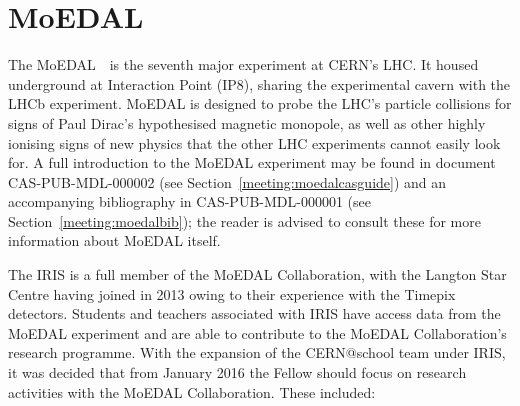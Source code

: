 \section{MoEDAL}
\label{sec:moedal}
The \acl{MoEDAL}~\cite{MoEDAL2009}\
is the seventh major experiment at \acs{CERN}'s \acf{LHC}.
It housed underground at Interaction Point (IP8), sharing
the experimental cavern with the \acs{LHCb} experiment.
%
\acs{MoEDAL} is designed to probe the \acs{LHC}'s particle collisions
for signs of Paul Dirac's hypothesised magnetic monopole,
as well as other highly ionising signs of new physics that
the other \acs{LHC} experiments cannot easily look for.
%
A full introduction to the \acs{MoEDAL} experiment may be found
in document CAS-PUB-MDL-000002 (see Section~\ref{meeting:moedalcasguide})
and an accompanying bibliography in CAS-PUB-MDL-000001
(see Section~\ref{meeting:moedalbib}); the reader is advised to
consult these for more information about \ac{MoEDAL} itself.
%

The \acf{IRIS} is a full member of 
the \acs{MoEDAL} Collaboration, with the Langton Star Centre having
joined in 2013 owing to their experience with the Timepix detectors.
Students and teachers associated with \acs{IRIS}
have access data from the \acs{MoEDAL} experiment and are able to
contribute to the \acs{MoEDAL} Collaboration's research programme.
%
With the expansion of the CERN@school team under \acs{IRIS},
it was decided that from January 2016
the Fellow should focus on research activities
with the \acs{MoEDAL} Collaboration. These included:

